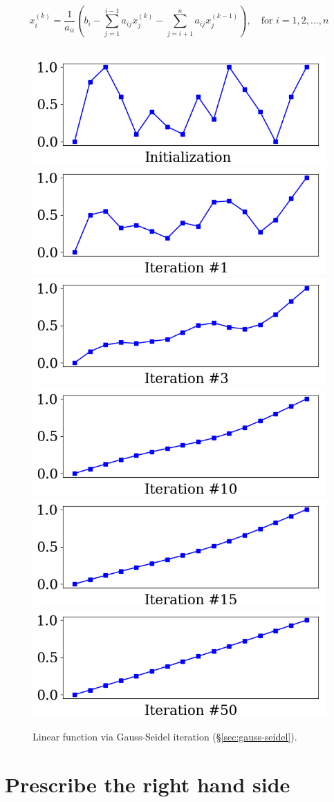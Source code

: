 \documentclass[notitlepage]{report}
\begin{document}
$$
x_i^{(k)} = \frac{1}{a_{ii}} \left(b_i - \sum\limits_{j=1}^{i-1} a_{ij}x_j^{(k)} -  \sum\limits_{j=i+1}^n a_{ij}x_j^{(k-1)} \right), \quad \text{for } i=1,2,\dots,n
$$

\inputminted[frame=single,linenos=true]{python}{listings/example_3.2.py}


\begin{figure}[ht]
    \centering
    \includegraphics[width=.32\linewidth]{example_3.2_0.png}
    \includegraphics[width=.32\linewidth]{example_3.2_1.png}
    \includegraphics[width=.32\linewidth]{example_3.2_2.png}
    \includegraphics[width=.32\linewidth]{example_3.2_3.png}
    \includegraphics[width=.32\linewidth]{example_3.2_4.png}
    \includegraphics[width=.32\linewidth]{example_3.2_5.png}
    \caption{Linear function via Gauss-Seidel iteration (\S\ref{sec:gauss-seidel}).}
    \label{fig:linsys_smooth_constrain}
\end{figure}



\section{Prescribe the right hand side}
\label{sec:rhs}
\end{document}
